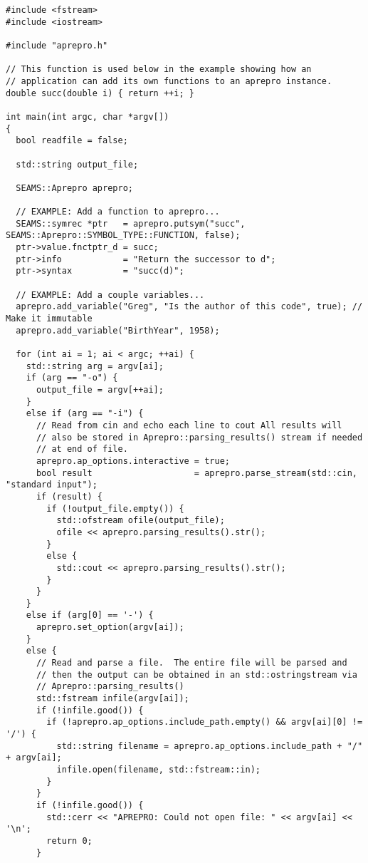 \begin{lstlisting}
#include <fstream>
#include <iostream>

#include "aprepro.h"

// This function is used below in the example showing how an
// application can add its own functions to an aprepro instance.
double succ(double i) { return ++i; }

int main(int argc, char *argv[])
{
  bool readfile = false;

  std::string output_file;

  SEAMS::Aprepro aprepro;

  // EXAMPLE: Add a function to aprepro...
  SEAMS::symrec *ptr   = aprepro.putsym("succ", SEAMS::Aprepro::SYMBOL_TYPE::FUNCTION, false);
  ptr->value.fnctptr_d = succ;
  ptr->info            = "Return the successor to d";
  ptr->syntax          = "succ(d)";

  // EXAMPLE: Add a couple variables...
  aprepro.add_variable("Greg", "Is the author of this code", true); // Make it immutable
  aprepro.add_variable("BirthYear", 1958);

  for (int ai = 1; ai < argc; ++ai) {
    std::string arg = argv[ai];
    if (arg == "-o") {
      output_file = argv[++ai];
    }
    else if (arg == "-i") {
      // Read from cin and echo each line to cout All results will
      // also be stored in Aprepro::parsing_results() stream if needed
      // at end of file.
      aprepro.ap_options.interactive = true;
      bool result                    = aprepro.parse_stream(std::cin, "standard input");
      if (result) {
        if (!output_file.empty()) {
          std::ofstream ofile(output_file);
          ofile << aprepro.parsing_results().str();
        }
        else {
          std::cout << aprepro.parsing_results().str();
        }
      }
    }
    else if (arg[0] == '-') {
      aprepro.set_option(argv[ai]);
    }
    else {
      // Read and parse a file.  The entire file will be parsed and
      // then the output can be obtained in an std::ostringstream via
      // Aprepro::parsing_results()
      std::fstream infile(argv[ai]);
      if (!infile.good()) {
        if (!aprepro.ap_options.include_path.empty() && argv[ai][0] != '/') {
          std::string filename = aprepro.ap_options.include_path + "/" + argv[ai];
          infile.open(filename, std::fstream::in);
        }
      }
      if (!infile.good()) {
        std::cerr << "APREPRO: Could not open file: " << argv[ai] << '\n';
        return 0;
      }


\end{lstlisting}
